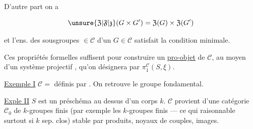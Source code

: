 
D'autre part on a

\[
\unsure{\mathfrak{Z}|\mathfrak{F}|\mathfrak{z}}(G\times G')=\mathfrak{Z}(G)\times\mathfrak{Z}(G')
\]

et  l'ens. des sousgroupes $\in\mathscr C$ d'un $G\in\mathscr C$ satisfait la condition minimale.

Ces propriétés formelles suffisent pour construire un \uline{pro-objet} de $\mathscr C$,  au moyen d'un système projectif , qu'on  désignera par $\pi_1^{\mathscr C}(S,\xi)$.

\uline{Exemple I} $\mathscr C={}$  définis par  . On retrouve le groupe fondamental.

\uline{Exple II} $S$ est un préschéma au dessus d'un corps $k$. $\mathscr C$ provient d'une catégorie $\mathscr C_0$ de $k$-groupes finis (par exemple  les $k$-groupes finis --- ce qui   raisonnable surtout si $k$ sep. clos) stable par produits, noyaux de couples, images.


